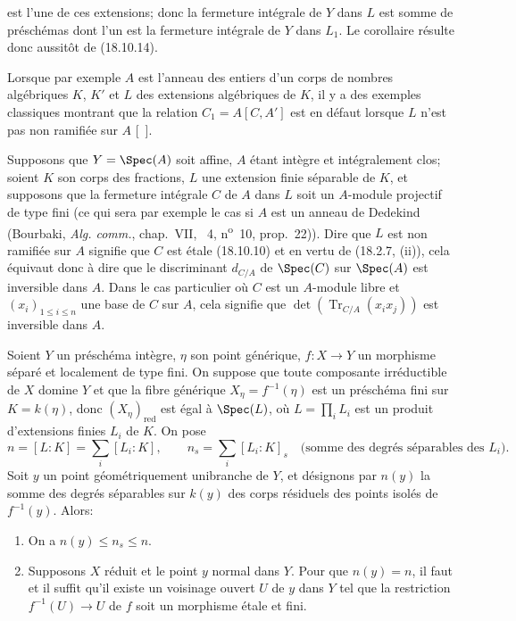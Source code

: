
est l'une de ces extensions; donc la fermeture intégrale de $Y$ dans $L$ est somme de préschémas dont l'un est la fermeture intégrale de $Y$ dans $L_1$. Le corollaire résulte donc aussitôt de (18.10.14).

Lorsque par exemple $A$ est l'anneau des entiers d'un corps de nombres algébriques $K$, $K'$ et $L$ des extensions algébriques de $K$, il y a des exemples classiques montrant que la relation $C_1=A[C,A']$ est en défaut lorsque $L$ n'est pas non ramifiée sur $A$ [\ ].

\begin{env}[18.10.15]
\label{IV.18.10.15}
Supposons que $Y=\Spec(A)$ soit affine, $A$ étant intègre et intégralement clos; soient $K$ son corps des fractions, $L$ une extension finie séparable de $K$, et supposons que la fermeture intégrale $C$ de $A$ dans $L$ soit un $A$-module projectif de type fini (ce qui sera par exemple le cas si $A$ est un anneau de Dedekind (Bourbaki, \emph{Alg. comm.}, chap.~VII, \textsection~4, n\textsuperscript{o}~10, prop.~22)). Dire que $L$ est non ramifiée sur $A$ signifie que $C$ est étale (18.10.10) et en vertu de (18.2.7, (ii)), cela équivaut donc à dire que le discriminant $d_{C/A}$ de $\Spec(C)$ sur $\Spec(A)$ est inversible dans $A$. Dans le cas particulier où $C$ est un $A$-module libre et $(x_i)_{1\leq i\leq n}$ une base de $C$ sur $A$, cela signifie que $\det(\operatorname{Tr}_{C/A}(x_ix_j))$ est inversible dans $A$.
\end{env}

\begin{theorem}[18.10.16]
\label{IV.18.10.16}
Soient $Y$ un préschéma intègre, $\eta$ son point générique, $f:X\to Y$ un morphisme séparé et localement de type fini. On suppose que toute composante irréductible de $X$ domine $Y$ et que la fibre générique $X_\eta=f^{-1}(\eta)$ est un préschéma fini sur $K=k(\eta)$, donc $(X_\eta)_{\mathrm{red}}$ est égal à $\Spec(L)$, où $L=\prod_iL_i$ est un produit d'extensions finies $L_i$ de $K$. On pose
\[
  n=[L:K]=\sum_i[L_i:K],\qquad n_s=\sum_i[L_i:K]_s \quad\text{(somme des degrés séparables des $L_i$)}.
\]
Soit $y$ un point géométriquement unibranche de $Y$, et désignons par $n(y)$ la somme des degrés séparables sur $k(y)$ des corps résiduels des points isolés de $f^{-1}(y)$. Alors:
\begin{enumerate}
  \item[(i)] On a $n(y)\leq n_s\leq n$.
  \item[(ii)] Supposons $X$ réduit et le point $y$ normal dans $Y$. Pour que $n(y)=n$, il faut et il suffit qu'il existe un voisinage ouvert $U$ de $y$ dans $Y$ tel que la restriction $f^{-1}(U)\to U$ de $f$ soit un morphisme étale et fini.
\end{enumerate}
\end{theorem}

